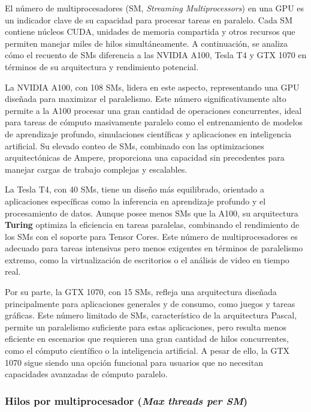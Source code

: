 \documentclass{article}
\begin{document}
			El número de multiprocesadores (SM, \textit{Streaming Multiprocessors}) en una GPU es un indicador clave de su capacidad para procesar tareas en paralelo. Cada SM contiene núcleos CUDA, unidades de memoria compartida y otros recursos que permiten manejar miles de hilos simultáneamente. A continuación, se analiza cómo el recuento de SMs diferencia a las NVIDIA A100, Tesla T4 y GTX 1070 en términos de su arquitectura y rendimiento potencial.

			La NVIDIA A100, con 108 SMs, lidera en este aspecto, representando una GPU diseñada para maximizar el paralelismo. Este número significativamente alto permite a la A100 procesar una gran cantidad de operaciones concurrentes, ideal para tareas de cómputo masivamente paralelo como el entrenamiento de modelos de aprendizaje profundo, simulaciones científicas y aplicaciones en inteligencia artificial. Su elevado conteo de SMs, combinado con las optimizaciones arquitectónicas de Ampere, proporciona una capacidad sin precedentes para manejar cargas de trabajo complejas y escalables.

			La Tesla T4, con 40 SMs, tiene un diseño más equilibrado, orientado a aplicaciones específicas como la inferencia en aprendizaje profundo y el procesamiento de datos. Aunque posee menos SMs que la A100, su arquitectura \textbf{Turing} optimiza la eficiencia en tareas paralelas, combinando el rendimiento de los SMs con el soporte para Tensor Cores. Este número de multiprocesadores es adecuado para tareas intensivas pero menos exigentes en términos de paralelismo extremo, como la virtualización de escritorios o el análisis de video en tiempo real.

			Por su parte, la GTX 1070, con 15 SMs, refleja una arquitectura diseñada principalmente para aplicaciones generales y de consumo, como juegos y tareas gráficas. Este número limitado de SMs, característico de la arquitectura Pascal, permite un paralelismo suficiente para estas aplicaciones, pero resulta menos eficiente en escenarios que requieren una gran cantidad de hilos concurrentes, como el cómputo científico o la inteligencia artificial. A pesar de ello, la GTX 1070 sigue siendo una opción funcional para usuarios que no necesitan capacidades avanzadas de cómputo paralelo.

		\subsubsection{Hilos por multiprocesador (\textit{Max threads per SM})}
\end{document}
